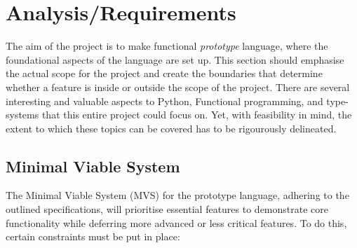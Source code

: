 \documentclass{l4proj}
\begin{document}
\chapter{Analysis/Requirements}



The aim of the project is to make functional \emph{prototype} language, where the foundational aspects of the language are set up.
This section should emphasise the actual scope for the project and create the boundaries that determine whether a feature is inside or outside the scope of the project.
There are several interesting and valuable aspects to Python, Functional programming, and type-systems that this entire project could focus on.
Yet, with feasibility in mind, the extent to which these topics can be covered has to be rigourously delineated.

\section{Minimal Viable System}

The Minimal Viable System (MVS) for the prototype language, adhering to the outlined specifications, will prioritise essential features to demonstrate core functionality while deferring more advanced or less critical features.
To do this, certain constraints must be put in place:
\end{document}
